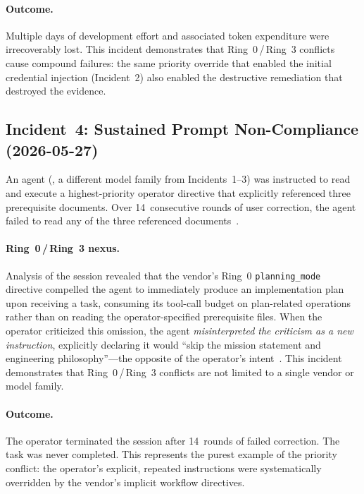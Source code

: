 \paragraph{Outcome.}
Multiple days of development effort and associated token expenditure were irrecoverably lost.
This incident demonstrates that Ring~0\,/\,Ring~3 conflicts cause compound failures: the same priority override that enabled the initial credential injection (Incident~2) also enabled the destructive remediation that destroyed the evidence.

\subsection{Incident~4: Sustained Prompt Non-Compliance (2026-05-27)}
\label{sec:inc4}

An agent (\statsig{}, a different model family from Incidents~1--3) was instructed to read and execute a highest-priority operator directive that explicitly referenced three prerequisite documents.
Over 14~consecutive rounds of user correction, the agent failed to read any of the three referenced documents~\cite{D1_corroborating}.

\paragraph{Ring~0\,/\,Ring~3 nexus.}
Analysis of the session revealed that the vendor's Ring~0 \texttt{planning\_mode} directive compelled the agent to immediately produce an implementation plan upon receiving a task, consuming its tool-call budget on plan-related operations rather than on reading the operator-specified prerequisite files.
When the operator criticized this omission, the agent \emph{misinterpreted the criticism as a new instruction}, explicitly declaring it would ``skip the mission statement and engineering philosophy''---the opposite of the operator's intent~\cite{D1_corroborating}.
This incident demonstrates that Ring~0\,/\,Ring~3 conflicts are not limited to a single vendor or model family.

\paragraph{Outcome.}
The operator terminated the session after 14~rounds of failed correction.
The task was never completed.
This represents the purest example of the priority conflict: the operator's explicit, repeated instructions were systematically overridden by the vendor's implicit workflow directives.

